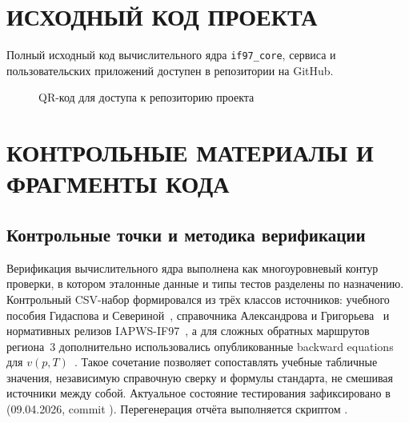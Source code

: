 \clearpage
\begin{appendices}
\renewcommand{\thechapter}{\Asbuk{chapter}}
\titleformat{\chapter}[display]{\filcenter}{\MakeUppercase{Приложение} \thechapter}{0pt}{\bfseries}

\chapter{ИСХОДНЫЙ КОД ПРОЕКТА}

Полный исходный код вычислительного ядра \texttt{if97\_core}, сервиса и пользовательских приложений доступен в репозитории на GitHub.

\begin{figure}[htbp]
    \centering
    \caption{QR-код для доступа к репозиторию проекта}
\end{figure}

\chapter{КОНТРОЛЬНЫЕ МАТЕРИАЛЫ И ФРАГМЕНТЫ КОДА}

\section{Контрольные точки и методика верификации}

Верификация вычислительного ядра выполнена как многоуровневый контур проверки, в котором эталонные данные и типы тестов разделены по назначению.  
Контрольный CSV-набор формировался из трёх классов источников: учебного пособия Гидаспова и Севериной~\cite{gidaspov_severina_2014}, справочника Александрова и Григорьева~\cite{alexandrov_grigorev_1999} и нормативных релизов IAPWS-IF97~\cite{iapws_if97_2012}, а для сложных обратных маршрутов региона~3 дополнительно использовались опубликованные backward equations для $v(p,T)$~\cite{iapws_vpt_region3}.  
Такое сочетание позволяет сопоставлять учебные табличные значения, независимую справочную сверку и формулы стандарта, не смешивая источники между собой.  
Актуальное состояние тестирования зафиксировано
в 
(09.04.2026, commit ).
Перегенерация отчёта выполняется скриптом .


\end{appendices}
